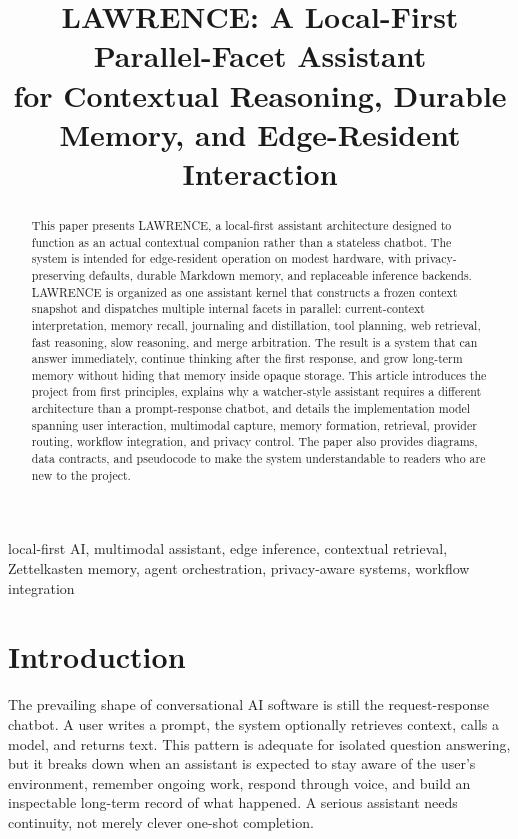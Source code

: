 \documentclass[conference]{IEEEtran}
\title{LAWRENCE: A Local-First Parallel-Facet Assistant\\for Contextual Reasoning, Durable Memory, and Edge-Resident Interaction}
\author{
\IEEEauthorblockN{Project Technical Article}
\IEEEauthorblockA{LAWRENCE v0.1 Architecture Description}
}
\begin{document}
\maketitle

\begin{abstract}
This paper presents LAWRENCE, a local-first assistant architecture designed to function as an actual contextual companion rather than a stateless chatbot. The system is intended for edge-resident operation on modest hardware, with privacy-preserving defaults, durable Markdown memory, and replaceable inference backends. LAWRENCE is organized as one assistant kernel that constructs a frozen context snapshot and dispatches multiple internal facets in parallel: current-context interpretation, memory recall, journaling and distillation, tool planning, web retrieval, fast reasoning, slow reasoning, and merge arbitration. The result is a system that can answer immediately, continue thinking after the first response, and grow long-term memory without hiding that memory inside opaque storage. This article introduces the project from first principles, explains why a watcher-style assistant requires a different architecture than a prompt-response chatbot, and details the implementation model spanning user interaction, multimodal capture, memory formation, retrieval, provider routing, workflow integration, and privacy control. The paper also provides diagrams, data contracts, and pseudocode to make the system understandable to readers who are new to the project.
\end{abstract}

\begin{IEEEkeywords}
local-first AI, multimodal assistant, edge inference, contextual retrieval, Zettelkasten memory, agent orchestration, privacy-aware systems, workflow integration
\end{IEEEkeywords}

\section{Introduction}
The prevailing shape of conversational AI software is still the request-response chatbot. A user writes a prompt, the system optionally retrieves context, calls a model, and returns text. This pattern is adequate for isolated question answering, but it breaks down when an assistant is expected to stay aware of the user's environment, remember ongoing work, respond through voice, and build an inspectable long-term record of what happened. A serious assistant needs continuity, not merely clever one-shot completion.
\end{document}
